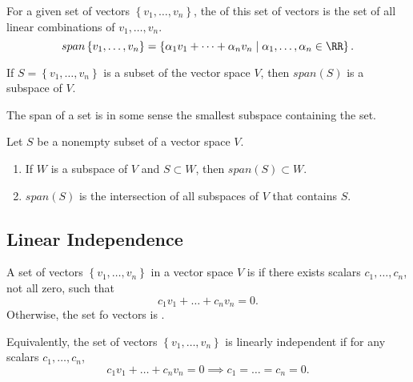 \begin{definition}
  For a given set of vectors $\left\{v_{1}, \dots, v_{n}\right\}$, the  of this set of vectors
  is the set of all linear combinations of $v_{1}, \dots, v_{n}$.
  \begin{equation*}
    span \left\{v_{1}, \dots, v_{n}\right\} = \left\{\alpha_{1}v_{1} + \dots + \alpha_{n}v_{n} \mid \alpha_{1}, \dots, \alpha_{n} \in \RR\right\}.
  \end{equation*}
\end{definition}

\begin{theorem}
  If $S = \left\{v_{1}, \dots, v_{n}\right\}$ is a subset of the vector space $V$, then 
  $span (S)$ is a subspace of $V$.
\end{theorem}

The span of a set is in some sense the smallest subspace containing the set.
\begin{theorem}
  Let $S$ be a nonempty subset of a vector space $V$.
  \begin{enumerate}[(1)]
    \item If $W$ is a subspace of $V$ and $S \subset W$, then $span (S) \subset W$.
    \item $span (S)$ is the intersection of all subspaces of $V$ that contains $S$.
  \end{enumerate}
\end{theorem}

\subsection{Linear Independence}
\begin{definition}
  A set of vectors $\left\{v_{1}, \dots, v_{n}\right\}$ in a vector space $V$ is 
  if there exists scalars $c_{1}, \dots, c_{n}$, not all zero, such that 
  \begin{equation*}
    c_{1}v_{1} + \dots + c_{n}v_{n} = 0.
  \end{equation*}
  Otherwise, the set fo vectors is .

  Equivalently, the set of vectors $\left\{v_{1}, \dots, v_{n}\right\}$ is linearly independent if for any scalars
  $c_{1}, \dots, c_{n}$, 
  \begin{equation*}
    c_{1}v_{1} + \dots + c_{n}v_{n} = 0 \implies c_{1} = \dots = c_{n} = 0.
  \end{equation*}
\end{definition}

